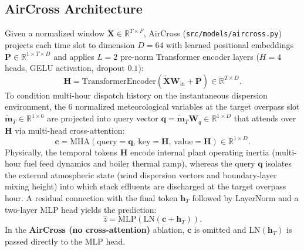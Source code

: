 \documentclass[conference]{IEEEtran}
\begin{document}
\subsection{AirCross Architecture}
Given a normalized window $\tilde{\mathbf{X}} \in \mathbb{R}^{T \times F}$, AirCross (\texttt{src/models/aircross.py}) projects each time slot to dimension $D = 64$ with learned positional embeddings $\mathbf{P} \in \mathbb{R}^{1 \times T \times D}$ and applies $L = 2$ pre-norm Transformer encoder layers ($H = 4$ heads, GELU activation, dropout $0.1$):
\begin{equation}
    \mathbf{H} = \text{TransformerEncoder}(\tilde{\mathbf{X}}\mathbf{W}_{\text{in}} + \mathbf{P}) \in \mathbb{R}^{T \times D}.
\end{equation}
To condition multi-hour dispatch history on the instantaneous dispersion environment, the 6 normalized meteorological variables at the target overpass slot $\tilde{\mathbf{m}}_T \in \mathbb{R}^{1 \times 6}$ are projected into query vector $\mathbf{q} = \tilde{\mathbf{m}}_T \mathbf{W}_q \in \mathbb{R}^{1 \times D}$ that attends over $\mathbf{H}$ via multi-head cross-attention:
\begin{equation}
    \mathbf{c} = \text{MHA}(\text{query}=\mathbf{q},\,\text{key}=\mathbf{H},\,\text{value}=\mathbf{H}) \in \mathbb{R}^{1 \times D}.
\end{equation}
Physically, the temporal tokens $\mathbf{H}$ encode internal plant operating inertia (multi-hour fuel feed dynamics and boiler thermal ramp), whereas the query $\mathbf{q}$ isolates the external atmospheric state (wind dispersion vectors and boundary-layer mixing height) into which stack effluents are discharged at the target overpass hour.
A residual connection with the final token $\mathbf{h}_T$ followed by LayerNorm and a two-layer MLP head yields the prediction:
\begin{equation}
    \hat{z} = \text{MLP}(\text{LN}(\mathbf{c} + \mathbf{h}_T)).
\end{equation}
In the \textbf{AirCross (no cross-attention)} ablation, $\mathbf{c}$ is omitted and $\text{LN}(\mathbf{h}_T)$ is passed directly to the MLP head.
\end{document}
